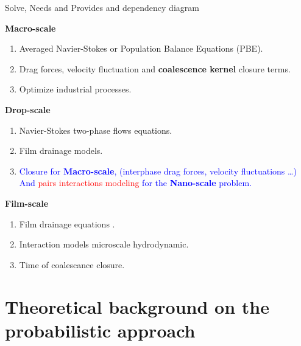 \documentclass{sintefbeamer}
\begin{document}
\begin{frame}{Solve, Needs and Provides and dependency diagram}
  
	\textbf{Macro-scale}
	\begin{enumerate}
		\item Averaged Navier-Stokes or Population Balance Equations (PBE). 
		\item Drag forces, velocity fluctuation and \textbf{coalescence kernel} closure terms. 
		\item Optimize industrial processes. 
	\end{enumerate}
  
	\textbf{Drop-scale}
	\begin{enumerate}
		\item Navier-Stokes two-phase flows equations. 
		\item Film drainage models.  
		\item \textcolor{blue}{Closure for \textbf{Macro-scale}, (interphase drag forces, velocity fluctuations \ldots) And \textcolor{red}{pairs interactions modeling} for the \textbf{Nano-scale} problem.}  
	\end{enumerate}
  
	\textbf{Film-scale}
	\begin{enumerate}
		\item Film drainage equations . 
		\item Interaction models microscale hydrodynamic.   
		\item Time of coalescance closure.  
	\end{enumerate}
  \centering
\end{frame}

\section{Theoretical background on the probabilistic approach}
\end{document}
